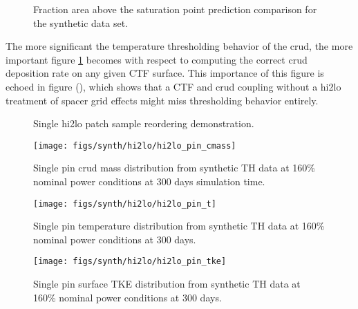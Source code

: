 \begin{figure}[H]%
    \centering
    \qquad
    \caption[]{Fraction area above the saturation point prediction comparison for the synthetic data set.}%
    \label{fig:frac_a}%
\end{figure}

The more significant the temperature thresholding behavior of the crud, the more important figure \ref{fig:frac_a} becomes with respect to computing the correct crud deposition rate on any given CTF surface.  This importance of this figure is echoed in figure (), which shows that a CTF and crud coupling without a hi2lo treatment of spacer grid effects might miss thresholding behavior entirely.

\begin{figure}[H]%
    \centering
    \qquad
    \caption[]{Single hi2lo patch sample reordering demonstration.}%
    \label{fig:reshuffle_a}%
\end{figure}


\begin{figure}[H]
    \centering
    \texttt{[image: figs/synth/hi2lo/hi2lo\_pin\_cmass]}
    \caption[Single pin crud mass distribution from synthetic TH data.]{Single pin crud mass distribution from synthetic TH data at 160\% nominal power conditions at 300 days simulation time.}
    \label{fig:hi2lopincmass}
\end{figure}
\begin{figure}[H]
    \centering
    \texttt{[image: figs/synth/hi2lo/hi2lo\_pin\_t]}
    \caption{Single pin temperature distribution from synthetic TH data at 160\% nominal power conditions at 300 days.}
    \label{fig:hi2lopint}
\end{figure}
\begin{figure}[H]
    \centering
    \texttt{[image: figs/synth/hi2lo/hi2lo\_pin\_tke]}
    \caption{Single pin surface TKE distribution from synthetic TH data at 160\% nominal power conditions at 300 days.}
    \label{fig:hi2lopintke}
\end{figure}

